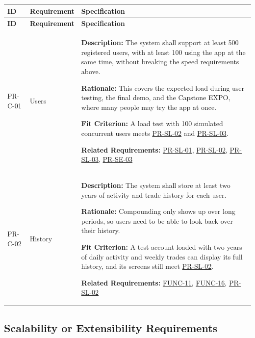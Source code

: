 \documentclass[12pt]{article}
\begin{document}
\small
\setlength{\tabcolsep}{4pt}
\begin{xltabular}{\textwidth}{|p{2.6cm}|p{3.4cm}|X|}
\hline
\textbf{ID} & \textbf{Requirement} & \textbf{Specification} \\
\hline
\endfirsthead
\hline
\textbf{ID} & \textbf{Requirement} & \textbf{Specification} \\
\hline
\endhead

PR-C-01\hypertarget{req:PR-C-01}{} &
Users &
\textbf{Description:} The system shall support at least 500 registered users, with at least 100 using the app at the same time, without breaking the speed requirements above.

\textbf{Rationale:} This covers the expected load during user testing, the final demo, and the Capstone EXPO, where many people may try the app at once.

\textbf{Fit Criterion:} A load test with 100 simulated concurrent users meets \hyperlink{req:PR-SL-02}{PR-SL-02} and \hyperlink{req:PR-SL-03}{PR-SL-03}.

\textbf{Related Requirements:} \hyperlink{req:PR-SL-01}{PR-SL-01}, \hyperlink{req:PR-SL-02}{PR-SL-02}, \hyperlink{req:PR-SL-03}{PR-SL-03}, \hyperlink{req:PR-SE-03}{PR-SE-03}\\
\hline

PR-C-02\hypertarget{req:PR-C-02}{} &
History &
\textbf{Description:} The system shall store at least two years of activity and trade history for each user.

\textbf{Rationale:} Compounding only shows up over long periods, so users need to be able to look back over their history.

\textbf{Fit Criterion:} A test account loaded with two years of daily activity and weekly trades can display its full history, and its screens still meet \hyperlink{req:PR-SL-02}{PR-SL-02}.

\textbf{Related Requirements:} \hyperlink{req:FUNC-11}{FUNC-11}, \hyperlink{req:FUNC-16}{FUNC-16}, \hyperlink{req:PR-SL-02}{PR-SL-02}\\
\hline

\end{xltabular}

\subsection{Scalability or Extensibility Requirements}
\end{document}
